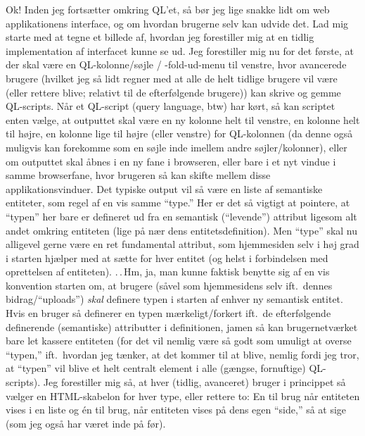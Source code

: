 \documentclass{report}
\begin{document}
Ok! Inden jeg fortsætter omkring QL'et, så bør jeg lige snakke lidt om web applikationens interface, og om hvordan brugerne selv kan udvide det. Lad mig starte med at tegne et billede af, hvordan jeg forestiller mig at en tidlig implementation af interfacet kunne se ud. Jeg forestiller mig nu for det første, at der skal være en QL-kolonne/søjle / -fold-ud-menu til venstre, hvor avancerede brugere (hvilket jeg så lidt regner med at alle de helt tidlige brugere vil være (eller rettere blive; relativt til de efterfølgende brugere)) kan skrive og gemme QL-scripts. Når et QL-script (query language, btw) har kørt, så kan scriptet enten vælge, at outputtet skal være en ny kolonne helt til venstre, en kolonne helt til højre, en kolonne lige til højre (eller venstre) for QL-kolonnen (da denne også muligvis kan forekomme som en søjle inde imellem andre søjler/kolonner), eller om outputtet skal åbnes i en ny fane i browseren, eller bare i et nyt vindue i samme browserfane, hvor brugeren så kan skifte mellem disse applikationsvinduer. Det typiske output vil så være en liste af semantiske entiteter, som regel af en vis samme ``type.'' Her er det så vigtigt at pointere, at ``typen'' her bare er defineret ud fra en semantisk (``levende'') attribut ligesom alt andet omkring entiteten (lige på nær dens entitetsdefinition). Men ``type'' skal nu alligevel gerne være en ret fundamental attribut, som hjemmesiden selv i høj grad i starten hjælper med at sætte for hver entitet (og helst i forbindelsen med oprettelsen af entiteten). .\,.\,Hm, ja, man kunne faktisk benytte sig af en vis konvention starten om, at brugere (såvel som hjemmesidens selv ift.\ dennes bidrag/``uploads'') \emph{skal} definere typen i starten af enhver ny semantisk entitet. Hvis en bruger så definerer en typen mærkeligt/forkert ift.\ de efterfølgende definerende (semantiske) attributter i definitionen, jamen så kan brugernetværket bare let kassere entiteten (for det vil nemlig være så godt som umuligt at overse ``typen,'' ift.\ hvordan jeg tænker, at det kommer til at blive, nemlig fordi jeg tror, at ``typen'' vil blive et helt centralt element i alle (gængse, fornuftige) QL-scripts). Jeg forestiller mig så, at hver (tidlig, avanceret) bruger i princippet så vælger en HTML-skabelon for hver type, eller rettere to: En til brug når entiteten vises i en liste og én til brug, når entiteten vises på dens egen ``side,'' så at sige (som jeg også har været inde på før). %
\end{document}
